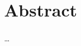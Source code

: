 \chapter{Abstract}                                 \label{ch:abstract}

\ldots

\instructionsabstract


\cleardoublepage

